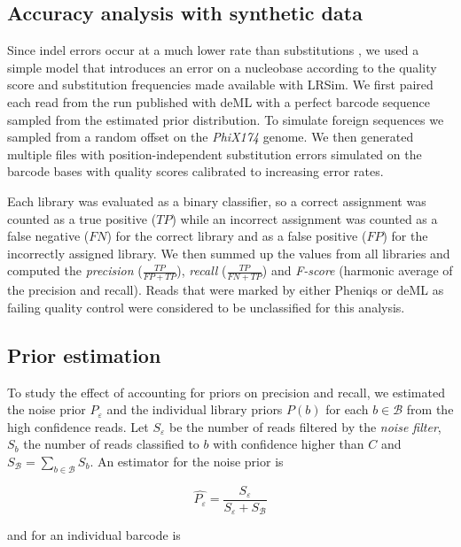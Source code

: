 \documentclass[twocolumn]{bmcart}
\begin{document}
\subsection*{Accuracy analysis with synthetic data}
Since indel errors occur at a much lower rate than substitutions \cite{doi:10.1038/s41598-018-29325-6}, we used a simple model that introduces an error on a nucleobase according to the quality score and substitution frequencies made available with LRSim\cite{doi:10.1016/j.csbj.2017.10.002}. We first paired each read from the run published with deML with a perfect barcode sequence sampled from the estimated prior distribution. To simulate foreign sequences we sampled from a random offset on the \emph{PhiX174} genome. We then generated multiple files with position-independent substitution errors simulated on the barcode bases with quality scores calibrated to increasing error rates.

Each library was evaluated as a binary classifier, so a correct assignment was counted as a true positive ($TP$) while an incorrect assignment was counted as a false negative ($FN$) for the correct library and as a false positive ($FP$) for the incorrectly assigned library. We then summed up the values from all libraries and computed the \emph{precision} ($\frac{TP}{FP + TP}$),  \emph{recall} ($\frac{TP}{FN + TP}$) and \emph{F-score} (harmonic average of the precision and recall). Reads that were marked by either Pheniqs or deML as failing quality control were considered to be unclassified for this analysis.

\subsection*{Prior estimation}
To study the effect of accounting for priors on precision and recall, we estimated the noise prior $P_{\varepsilon}$ and the individual library priors $P(b)$ for each $b \in \mathcal{B}$ from the high confidence reads. Let $S_{\varepsilon}$ be the number of reads filtered by the \emph{noise filter}, $S_{b}$ the number of reads classified to $b$ with confidence higher than $C$ and $S_\mathcal{B} = \sum_{b \in \mathcal{B}} S_{b}$. An estimator for the noise prior is

%
\begin{equation}
\hat{P_{\varepsilon}} = \frac{S_{\varepsilon}}{S_{\varepsilon} + S_\mathcal{B}}
\end{equation}
%

and for an individual barcode is
\end{document}
